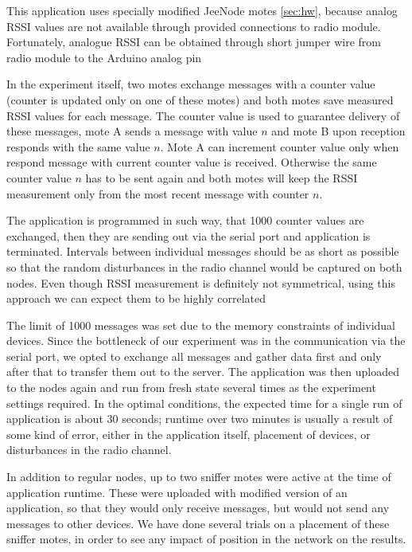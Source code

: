 \documentclass[
  print, %
  table,   %
  nolof,     %
  nolot,     %
           oneside
]{fithesis3}
\begin{document}
  This application uses specially modified JeeNode motes \ref{sec:hw}, because analog RSSI values are not available through provided connections to radio module. Fortunately, analogue RSSI can be obtained through short jumper wire from radio module to the Arduino analog pin %

  In the experiment itself, two motes exchange messages with a counter value (counter is updated only on one of these motes) and both motes save measured RSSI values for each message. The counter value is used to guarantee delivery of these messages, mote A sends a message with value $n$ and mote B upon reception responds with the same value $n$. Mote A can increment counter value only when respond message with current counter value is received. Otherwise the same counter value $n$ has to be sent again and both motes will keep the RSSI measurement only from the most recent message with counter $n$.

  The application is programmed in such way, that 1000 counter values are exchanged, then they are sending out via the serial port and application is terminated. Intervals between individual messages should be as short as possible so that the random disturbances in the radio channel would be captured on both nodes. Even though RSSI measurement is definitely not symmetrical, using this approach we can expect them to be highly correlated %

  The limit of 1000 messages was set due to the memory constraints of individual devices. Since the bottleneck of our experiment was in the communication via the serial port, we opted to exchange all messages and gather data first and only after that to transfer them out to the server. The application was then uploaded to the nodes again and run from fresh state several times as the experiment settings required. In the optimal conditions, the expected time for a single run of application is about 30 seconds; runtime over two minutes is usually a result of some kind of error, either in the application itself, placement of devices, or disturbances in the radio channel.

  In addition to regular nodes, up to two sniffer motes were active at the time of application runtime. These were uploaded with modified version of an application, so that they would only receive messages, but would not send any messages to other devices. We have done several trials on a placement of these sniffer motes, in order to see any impact of position in the network on the results.
\end{document}
